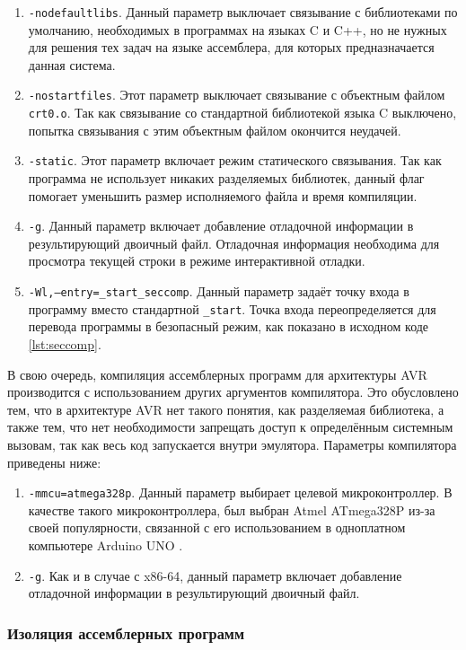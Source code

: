 \documentclass[a4paper,article,14pt]{extarticle}
\begin{document}
\begin{enumerate}
    \item \texttt{-nodefaultlibs}. Данный параметр выключает связывание с библиотеками по умолчанию, необходимых в программах на языках C и C++, но не нужных для решения тех задач на языке ассемблера, для которых предназначается данная система.
    \item \texttt{-nostartfiles}. Этот параметр выключает связывание с объектным файлом \texttt{crt0.o}. Так как связывание со стандартной библиотекой языка C выключено, попытка связывания с этим объектным файлом окончится неудачей.
    \item \texttt{-static}. Этот параметр включает режим статического связывания. Так как программа не использует никаких разделяемых библиотек, данный флаг помогает уменьшить размер исполняемого файла и время компиляции.
    \item \texttt{-g}. Данный параметр включает добавление отладочной информации в результирующий двоичный файл. Отладочная информация необходима для просмотра текущей строки в режиме интерактивной отладки.
    \item \texttt{-Wl,--entry=\_start\_seccomp}. Данный параметр задаёт точку входа в программу вместо стандартной \texttt{\_start}. Точка входа переопределяется для перевода программы в безопасный режим, как показано в исходном коде \ref{lst:seccomp}.
\end{enumerate}

В свою очередь, компиляция ассемблерных программ для архитектуры AVR производится с использованием других аргументов компилятора. Это обусловлено тем, что в архитектуре AVR нет такого понятия, как разделяемая библиотека, а также тем, что нет необходимости запрещать доступ к определённым системным вызовам, так как весь код запускается внутри эмулятора. Параметры компилятора приведены ниже:

\begin{enumerate}
    \item \texttt{-mmcu=atmega328p}. Данный параметр выбирает целевой микроконтроллер. В качестве такого микроконтроллера, был выбран Atmel ATmega328P из-за своей популярности, связанной с его использованием в одноплатном компьютере Arduino UNO \cite{arduinouno}.
    \item \texttt{-g}. Как и в случае с x86-64, данный параметр включает добавление отладочной информации в результирующий двоичный файл.
\end{enumerate}

\subsubsection{Изоляция ассемблерных программ}
\end{document}
